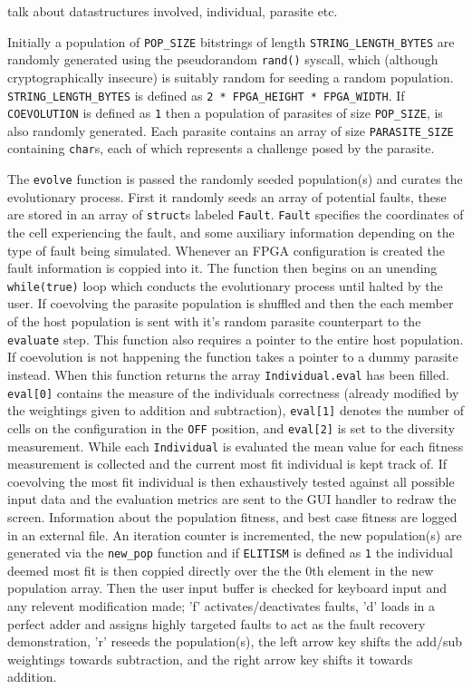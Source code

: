 \todo talk about datastructures involved, individual, parasite etc.

Initially a population of \texttt{POP\_SIZE} bitstrings of length \texttt{STRING\_LENGTH\_BYTES}
are randomly generated using the pseudorandom \texttt{rand()} syscall, which
(although cryptographically insecure) is suitably random for seeding a random
population. \texttt{STRING\_LENGTH\_BYTES} is defined as \texttt{2 * FPGA\_HEIGHT * FPGA\_WIDTH}.
If \texttt{COEVOLUTION} is defined as \texttt{1} then a population of
parasites of size \texttt{POP\_SIZE}, is also randomly generated. Each parasite
contains an array of size \texttt{PARASITE\_SIZE} containing \texttt{char}s, each of which represents a
challenge posed by the parasite.

The \texttt{evolve} function is passed the randomly seeded population(s) and
curates the evolutionary process. First it randomly seeds an array of potential
faults, these are stored in an array of \texttt{struct}s labeled \texttt{Fault}.
\texttt{Fault} specifies the coordinates of the cell experiencing the fault,
and some auxiliary information depending on the type of fault being simulated.
Whenever an FPGA configuration is created the fault information is coppied into it.
The function then begins on an unending \texttt{while(true)} loop which conducts
the evolutionary process until halted by the user. If coevolving the parasite
population is shuffled and then the each member of the host population is sent
with it's random parasite counterpart to the \texttt{evaluate} step. This function
also requires a pointer to the entire host population. If coevolution is not
happening the function takes a pointer to a dummy parasite instead. When this
function returns the array \texttt{Individual.eval} has been filled. \texttt{eval[0]}
contains the measure of the individuals correctness (already modified by the
weightings given to addition and subtraction), \texttt{eval[1]} denotes the number
of cells on the configuration in the \texttt{OFF} position, and \texttt{eval[2]}
is set to the diversity measurement. While each \texttt{Individual} is
evaluated the mean value for each fitness measurement is collected and the current
most fit individual is kept track of. If coevolving the most fit individual is then
exhaustively tested against all possible input data and the evaluation metrics
are sent to the GUI handler to redraw
the screen. Information about the population fitness, and best case fitness are
logged in an external file. An iteration counter is incremented, the new population(s)
are generated via the \texttt{new\_pop} function and if \texttt{ELITISM}
is defined as \texttt{1} the individual deemed most fit is then coppied directly over
the the 0th element in the new population array.
Then the user input buffer is checked for keyboard input and any relevent
modification made;
'f' activates/deactivates faults, 'd' loads in a perfect adder and assigns highly targeted faults
to act as the fault recovery demonstration, 'r' reseeds the population(s), the
left arrow key shifts the add/sub weightings towards subtraction, and the right
arrow key shifts it towards addition.


